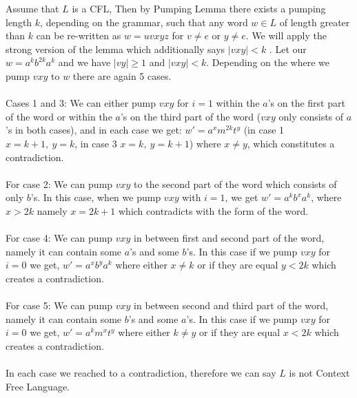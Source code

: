 \documentclass[a4paper,12pt]{article}
\begin{document}
\begin{tcolorbox}
Assume that $L$ is a CFL, Then by Pumping Lemma there exists a pumping length $k$, depending on the grammar, such that any word $w \in L$ of length greater than $k$ can be re-written as $w=uvxyz$ for $v \neq e$ or $y \neq e$. We will apply the strong version of the lemma which additionally says $|vxy|<k$ . Let our $w=a^kb^{2k}a^k$ and we have $|vy|\geq 1$ and $|vxy| < k$. Depending on the where we pump $vxy$ to $w$ there are again 5 cases.\\\\
Cases 1 and 3: We can either pump $vxy$ for $i=1$ within the $a$'s on the first part of the word or within the $a$'s on the third part of the word ($vxy$ only consists of $a$'s in both cases), and in each case we get: $w'=a^xm^{2k}t^y$ (in case 1 $x=k+1 ,\ y=k$, in case 3 $x=k ,\ y=k+1$) where $x\neq y$, which constitutes a contradiction.\\\\
For case 2: We can pump $vxy$ to the second part of the word which consists of only $b$'s. In this case, when we pump $vxy$ with $i=1$, we get $w'=a^kb^xa^k$, where $x > 2k$ namely $x = 2k + 1$ which contradicts with the form of the word.\\\\
For case 4: We can pump $vxy$ in between first and second part of the word, namely it can contain some $a$'s and some $b$'s. In this case if we pump $vxy$ for $i=0$ we get, $w'=a^xb^ya^k$ where either $x\neq k$ or if they are equal $y < 2k$ which creates a contradiction.\\\\
For case 5: We can pump $vxy$ in between second and third part of the word, namely it can contain some $b$'s and some $a$'s. In this case if we pump $vxy$ for $i=0$ we get, $w'=a^km^xt^y$ where either $k\neq y$ or if they are equal $x < 2k$ which creates a contradiction.\\\\

In each case we reached to a contradiction, therefore we can say $L$ is not Context Free Language.  \\\\
\end{tcolorbox}
\end{document}
